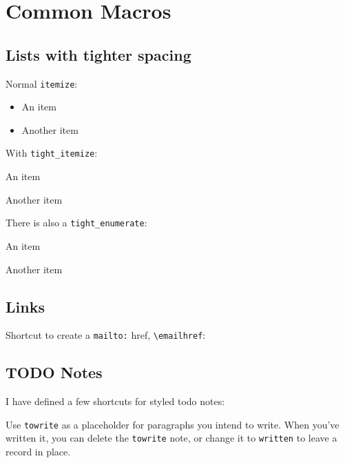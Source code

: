 \section{Common Macros}

\subsection{Lists with tighter spacing}

Normal \lstinline{itemize}:

\begin{itemize}
    \item An item
    \item Another item
\end{itemize}

With \lstinline{tight_itemize}:

\begin{tight_itemize}
    \item An item
    \item Another item
\end{tight_itemize}

There is also a \lstinline{tight_enumerate}:

\begin{tight_enumerate}
    \item An item
    \item Another item
\end{tight_enumerate}


\subsection{Links}

Shortcut to create a \lstinline{mailto:} href, \lstinline{\emailhref}:


\subsection{TODO Notes}

I have defined a few shortcuts for styled todo notes:

Use \lstinline{towrite} as a placeholder for paragraphs you intend to write.
When you've written it, you can delete the \lstinline{towrite} note,
or change it to \lstinline{written} to leave a record in place.



